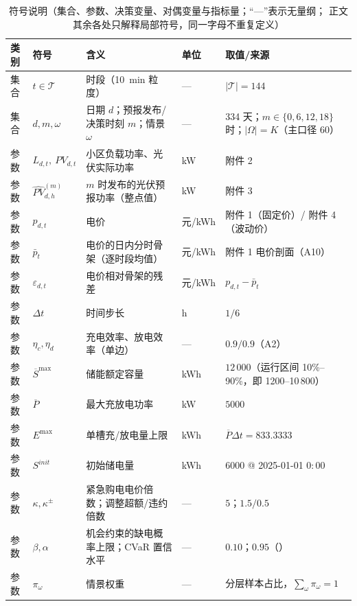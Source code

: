 \begin{table}[htbp]
  \centering
  \caption{符号说明（集合、参数、决策变量、对偶变量与指标量；“---”表示无量纲；
            正文其余各处只解释局部符号，同一字母不重复定义）}
  \label{tab:notation}
  \scriptsize
  \setlength{\tabcolsep}{3pt}
  \begin{tabularx}{\linewidth}{C{0.85cm} C{2.05cm} L{6.55cm} C{1.05cm} Y}
    \toprule
    类别 & 符号 & 含义 & 单位 & 取值/来源 \\
    \midrule
    集合 & \(t\in\mathcal T\) & 时段（10~min 粒度） & --- & \(|\mathcal T|=144\) \\
    集合 & \(d,m,\omega\) & 日期 \(d\)；预报发布/决策时刻 \(m\)；情景 \(\omega\) & --- & 334 天；\(m\in\{0,6,12,18\}\) 时；\(|\Omega|=K\)（主口径 60） \\
    参数 & \(L_{d,t},\ PV_{d,t}\) & 小区负载功率、光伏实际功率 & kW & 附件 2 \\
    参数 & \(\widehat{PV}^{(m)}_{d,h}\) & \(m\) 时发布的光伏预报功率（整点值） & kW & 附件 3 \\
    参数 & \(p_{d,t}\) & 电价 & 元/kWh & 附件 1（固定价）/ 附件 4（波动价） \\
    参数 & \(\bar p_t\) & 电价的日内分时骨架（逐时段均值） & 元/kWh & 附件 1 电价剖面（A10） \\
    参数 & \(\varepsilon_{d,t}\) & 电价相对骨架的残差 & 元/kWh & \(p_{d,t}-\bar p_t\) \\
    参数 & \(\Delta t\) & 时间步长 & h & \(1/6\) \\
    参数 & \(\eta_c,\eta_d\) & 充电效率、放电效率（单边） & --- & \(0.9/0.9\)（A2） \\
    参数 & \(\overline S^{\max}\) & 储能额定容量 & kWh & \(12\,000\)（运行区间 10\%--90\%，即 1200--10\,800） \\
    参数 & \(\overline P\) & 最大充放电功率 & kW & \(5000\) \\
    参数 & \(E^{\max}\) & 单槽充/放电量上限 & kWh & \(\overline P\Delta t=833.3333\) \\
    参数 & \(S^{init}\) & 初始储电量 & kWh & \(6000\) @ 2025-01-01 \(0{:}00\) \\
    参数 & \(\kappa,\kappa^{\pm}\) & 紧急购电电价倍数；调整超额/违约倍数 & --- & \(5\)；\(1.5/0.5\) \\
    参数 & \(\beta,\alpha\) & 机会约束的缺电概率上限；CVaR 置信水平 & --- & \(0.10\)；\(0.95\)（） \\
    参数 & \(\pi_\omega\) & 情景权重 & --- & 分层样本占比，\(\sum_\omega\pi_\omega=1\) \\

\end{tabularx}
\end{table}
